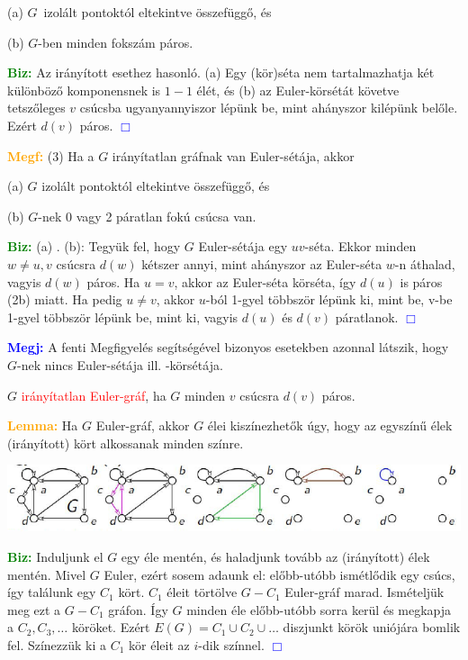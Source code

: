 \documentclass[../szamtud.tex]{subfiles}
\begin{document}
            (a) $G$ izolált pontoktól eltekintve összefüggő, és

            (b) $G$-ben minden fokszám páros.

        \textcolor{green}{\textbf{Biz:}} Az irányított esethez hasonló. (a) Egy (kör)séta nem tartalmazhatja két különböző komponensnek is $1-1$ élét, és (b) az Euler-körsétát követve tetszőleges $v$ csúcsba ugyanyannyiszor lépünk be, mint ahányszor kilépünk belőle. Ezért $d(v)$ páros.  \textcolor{blue}{$\Box$} 

        \textcolor{orange}{\textbf{Megf:}} (3) Ha a $G$ irányítatlan gráfnak van Euler-sétája, akkor 

            (a) $G$ izolált pontoktól eltekintve összefüggő, és

            (b) $G$-nek 0 vagy 2 páratlan fokú csúcsa van.

        \textcolor{green}{\textbf{Biz:}} (a) \checkmark. (b): Tegyük fel, hogy $G$ Euler-sétája egy $uv$-séta. Ekkor minden $w \neq u,v$ csúcsra $d(w)$ kétszer annyi, mint ahányszor az Euler-séta $w$-n áthalad, vagyis $d(w)$ páros. Ha $u = v$, akkor az Euler-séta körséta, így $d(u)$ is páros (2b) miatt. Ha pedig $u \neq v$, akkor $u$-ból 1-gyel többször lépünk ki, mint be, v-be 1-gyel többször lépünk be, mint ki, vagyis $d(u)$ és $d(v)$ páratlanok.  \textcolor{blue}{$\Box$}

        \textcolor{blue}{\textbf{Megj:}} A fenti Megfigyelés segítségével bizonyos esetekben azonnal látszik, hogy $G$-nek nincs Euler-sétája ill. -körsétája.

        $G$ \textcolor{red}{irányítatlan Euler-gráf}, ha $G$ minden $v$ csúcsra $d(v)$ páros.

        \textcolor{orange}{\textbf{Lemma:}} Ha $G$ Euler-gráf, akkor $G$ élei kiszínezhetők úgy, hogy az egyszínű élek (irányított) kört alkossanak minden színre.

        \includegraphics[width=\textwidth]{img/2.png}

        \textcolor{green}{\textbf{Biz:}} Induljunk el $G$ egy éle mentén, és haladjunk tovább az (irányított) élek mentén. Mivel $G$ Euler, ezért sosem adaunk el: előbb-utóbb ismétlődik egy csúcs, így találunk egy $C_1$ kört. $C_1$ éleit törtölve $G-C_1$ Euler-gráf marad. Ismételjük meg ezt a $G-C_1$ gráfon. Így $G$ minden éle előbb-utóbb sorra kerül és megkapja a $C_2, C_3, \dots$ köröket. Ezért $E(G) = C_1 \cup C_2 \cup \dots$ diszjunkt körök uniójára bomlik fel. Színezzük ki a $C_1$ kör éleit az $i$-dik színnel.  \textcolor{blue}{$\Box$}
\end{document}
